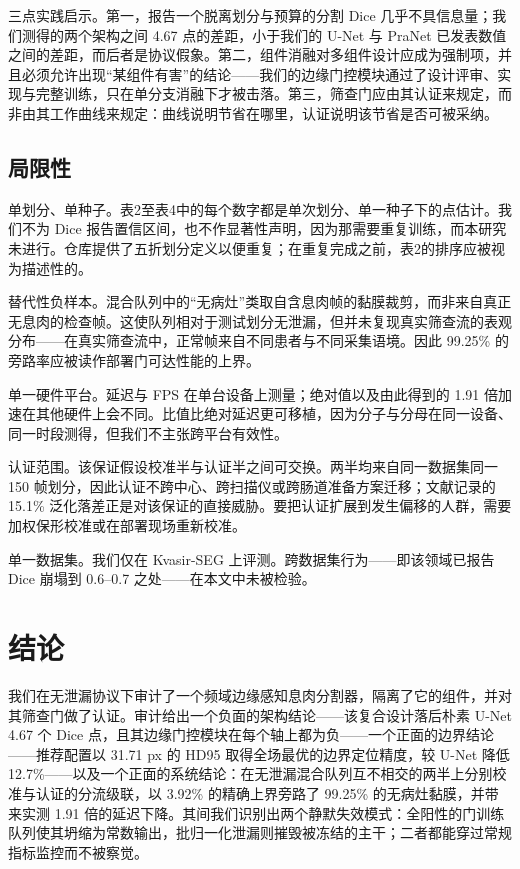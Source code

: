 \documentclass[conference]{IEEEtran}
\begin{document}
三点实践启示。第一，报告一个脱离划分与预算的分割 Dice 几乎不具信息量；我们测得的两个架构之间 4.67 点的差距，小于我们的 U-Net 与 PraNet 已发表数值之间的差距，而后者是协议假象。第二，组件消融对多组件设计应成为强制项，并且必须允许出现“某组件有害”的结论——我们的边缘门控模块通过了设计评审、实现与完整训练，只在单分支消融下才被击落。第三，筛查门应由其认证来规定，而非由其工作曲线来规定：曲线说明节省在哪里，认证说明该节省是否可被采纳。

\subsection{局限性}

单划分、单种子。表2至表4中的每个数字都是单次划分、单一种子下的点估计。我们不为 Dice 报告置信区间，也不作显著性声明，因为那需要重复训练，而本研究未进行。仓库提供了五折划分定义以便重复；在重复完成之前，表2的排序应被视为描述性的。

替代性负样本。混合队列中的“无病灶”类取自含息肉帧的黏膜裁剪，而非来自真正无息肉的检查帧。这使队列相对于测试划分无泄漏，但并未复现真实筛查流的表观分布——在真实筛查流中，正常帧来自不同患者与不同采集语境。因此 99.25\% 的旁路率应被读作部署门可达性能的上界。

单一硬件平台。延迟与 FPS 在单台设备上测量；绝对值以及由此得到的 1.91 倍加速在其他硬件上会不同。比值比绝对延迟更可移植，因为分子与分母在同一设备、同一时段测得，但我们不主张跨平台有效性。

认证范围。该保证假设校准半与认证半之间可交换。两半均来自同一数据集同一 150 帧划分，因此认证不跨中心、跨扫描仪或跨肠道准备方案迁移；文献记录的 15.1\% 泛化落差正是对该保证的直接威胁\cite{divya2026review}。要把认证扩展到发生偏移的人群，需要加权保形校准或在部署现场重新校准。

单一数据集。我们仅在 Kvasir-SEG 上评测。跨数据集行为——即该领域已报告 Dice 崩塌到 0.6–0.7 之处\cite{xiao2026prysmnet}——在本文中未被检验。

\section{结论}

我们在无泄漏协议下审计了一个频域边缘感知息肉分割器，隔离了它的组件，并对其筛查门做了认证。审计给出一个负面的架构结论——该复合设计落后朴素 U-Net 4.67 个 Dice 点，且其边缘门控模块在每个轴上都为负——一个正面的边界结论——推荐配置以 31.71 px 的 HD95 取得全场最优的边界定位精度，较 U-Net 降低 12.7\%——以及一个正面的系统结论：在无泄漏混合队列互不相交的两半上分别校准与认证的分流级联，以 3.92\% 的精确上界旁路了 99.25\% 的无病灶黏膜，并带来实测 1.91 倍的延迟下降。其间我们识别出两个静默失效模式：全阳性的门训练队列使其坍缩为常数输出，批归一化泄漏则摧毁被冻结的主干；二者都能穿过常规指标监控而不被察觉。
\end{document}
